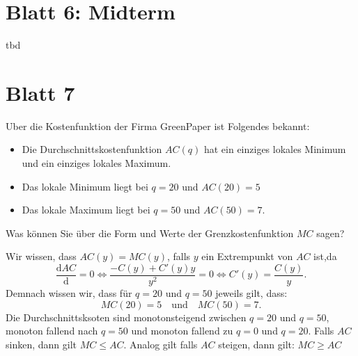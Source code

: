 \section{Blatt 6: Midterm}

\begin{center}
	tbd
\end{center}

\section{Blatt 7}

\begin{question}
	Uber die Kostenfunktion der Firma GreenPaper ist Folgendes bekannt:
	\begin{itemize}
		\item Die Durchschnittskostenfunktion $AC(q)$ hat ein einziges lokales Minimum und ein einziges
		      lokales Maximum.
		\item Das lokale Minimum liegt bei $q = 20$ und $AC(20) = 5$
		\item Das lokale Maximum liegt bei $q = 50$ und $AC(50) = 7$.
	\end{itemize}
	Was können Sie über die Form und Werte der Grenzkostenfunktion $MC$ sagen?

\end{question}

\begin{solution}
	Wir wissen, dass $AC(y) = MC(y)$, falls $y$ ein Extrempunkt von $AC$ ist,da
	\[
		\frac{\mathrm{d} AC}{\mathrm{d}} = 0 \iff \frac{-C(y) + C'(y) y}{y^2} = 0 \iff C'(y) = \frac{C(y)}{y}
		.\]
	Demnach wissen wir, dass für $q=20$ und $q=50$ jeweils gilt, dass:
	\[
		MC(20) = 5 \quad \text{und} \quad MC(50) = 7
		.\]
	Die Durchschnittsksoten sind monotonsteigend zwischen $q=20$ und $q=50$, monoton fallend nach $q=50$ und monoton fallend zu $q=0$ und $q=20$.
	Falls $AC$ sinken, dann gilt $MC \le  AC$. Analog gilt falls $AC$ steigen, dann gilt: $MC \ge AC$
\end{solution}



